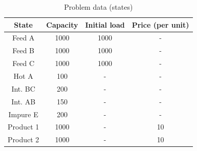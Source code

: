 \begin{table}[htb]
\centering
\caption{Problem data (states)}
\label{tab:statelevels}
\begin{tabular}{@{}cccc@{}}
\toprule
\textbf{State} & \textbf{Capacity} & \textbf{Initial load} & \textbf{Price (per unit)} \\ \midrule
Feed A         & 1000              & 1000                  & -                         \\
Feed B         & 1000              & 1000                  & -                         \\
Feed C         & 1000              & 1000                  & -                         \\
Hot A          & 100               & -                     & -                         \\
Int. BC        & 200               & -                     & -                         \\
Int. AB        & 150               & -                     & -                         \\
Impure E       & 200               & -                     & -                         \\
Product 1      & 1000              & -                     & 10                        \\
Product 2      & 1000              & -                     & 10                        \\ \bottomrule
\end{tabular}
\end{table}

